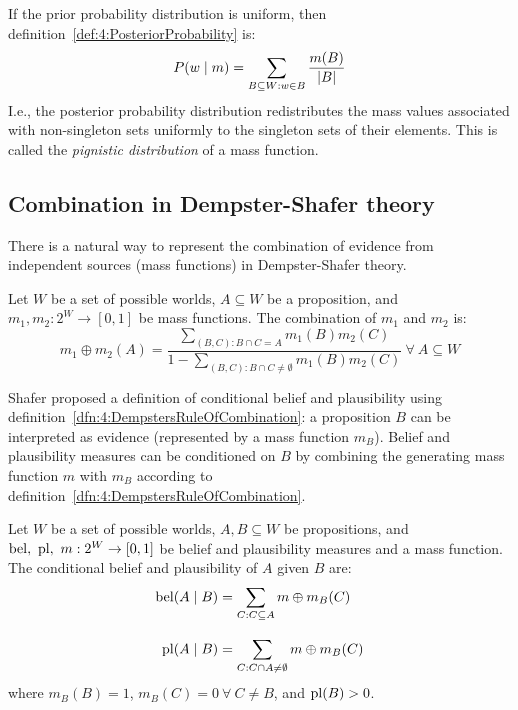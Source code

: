 If the prior probability distribution is uniform, then
definition~\ref{def:4:PosteriorProbability} is:
\begin{equation*}
  P(w \mid m) = \sum_{B \subseteq W : w \in B} \frac{m(B)}{|B|}
\end{equation*}
I.e., the posterior probability distribution redistributes the mass values
associated with non-singleton sets uniformly to the singleton sets of their
elements.
This is called the \textit{pignistic distribution} of a mass function.

\subsection{Combination in Dempster-Shafer theory}

There is a natural way to represent the combination of evidence from independent
sources (mass functions) in Dempster-Shafer theory.

\begin{dfn}
  \label{dfn:4:DempstersRuleOfCombination}
  Let $W$ be a set of possible worlds, $A \subseteq W$ be a proposition, and
  $m_1, m_2 : 2^W \to [0, 1]$ be mass functions.
  The combination of $m_1$ and $m_2$ is:
  \begin{equation}
    \label{eqn:4:DempstersRuleOfCombination}
    m_1 \oplus m_2 (A)
    = \frac{
      \sum_{(B, C) : B \cap C = A} m_1(B) m_2(C)
    }{
      1 - \sum_{(B, C) : B \cap C \neq \emptyset} m_1(B) m_2(C)
    } \ \forall\ A \subseteq W
  \end{equation}
\end{dfn}

Shafer proposed a definition of conditional belief and plausibility using
definition~\ref{dfn:4:DempstersRuleOfCombination}: a proposition $B$ can be
interpreted as evidence (represented by a mass function $m_B$).
Belief and plausibility measures can be conditioned on $B$ by combining the
generating mass function $m$ with $m_B$ according to
definition~\ref{dfn:4:DempstersRuleOfCombination}.

\begin{dfn}
  \label{dfn:4:ConditionalBeliefPlausibility}
  Let $W$ be a set of possible worlds, $A, B \subseteq W$ be propositions, and
  $\operatorname*{bel},\ \operatorname*{pl},\ m : 2^W \to [0, 1]$ be belief and plausibility measures and a
  mass function.
  The conditional belief and plausibility of $A$ given $B$ are:
  \begin{align}
    \label{eqn:4:ConditionalBelief}
    \operatorname*{bel}(A \mid B)
     & = \sum_{C : C \subseteq A} m \oplus m_B(C)           \\[2ex]
    \label{eqn:4:ConditionalPlausibility}
    \operatorname*{pl}(A \mid B)
     & = \sum_{C : C \cap A \neq \emptyset} m \oplus m_B(C)
  \end{align}
  where $m_B(B) = 1$, $m_B(C) = 0\ \forall\ C \neq B$, and $\operatorname*{pl}(B) > 0$.
\end{dfn}

